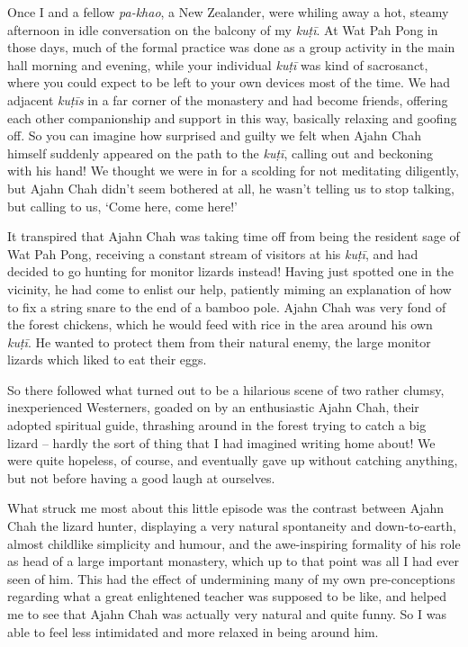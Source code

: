 Once I and a fellow \emph{pa-khao}, a New Zealander, were whiling away a
hot, steamy afternoon in idle conversation on the balcony of my
\emph{kuṭī}. At Wat Pah Pong in those days, much of the formal practice
was done as a group activity in the main hall morning and evening, while
your individual \emph{kuṭī} was kind of sacrosanct, where you could
expect to be left to your own devices most of the time. We had adjacent
\emph{kuṭīs} in a far corner of the monastery and had become friends, 
offering each other companionship and support in this way, basically
relaxing and goofing off. So you can imagine how surprised and guilty we
felt when Ajahn Chah himself suddenly appeared on the path to the
\emph{kuṭī}, calling out and beckoning with his hand! We thought we were
in for a scolding for not meditating diligently, but Ajahn Chah didn't
seem bothered at all, he wasn't telling us to stop talking, but calling
to us, `Come here, come here!'

It transpired that Ajahn Chah was taking time off from being the
resident sage of Wat Pah Pong, receiving a constant stream of visitors
at his \emph{kuṭī}, and had decided to go hunting for monitor lizards
instead! Having just spotted one in the vicinity, he had come to enlist
our help, patiently miming an explanation of how to fix a string snare
to the end of a bamboo pole. Ajahn Chah was very fond of the forest
chickens, which he would feed with rice in the area around his own
\emph{kuṭī}. He wanted to protect them from their natural enemy, the
large monitor lizards which liked to eat their eggs. 

So there followed what turned out to be a hilarious scene of two rather
clumsy, inexperienced Westerners, goaded on by an enthusiastic Ajahn
Chah, their adopted spiritual guide, thrashing around in the forest
trying to catch a big lizard -- hardly the sort of thing that I had
imagined writing home about! We were quite hopeless, of course, and
eventually gave up without catching anything, but not before having a
good laugh at ourselves. 

What struck me most about this little episode was the contrast between
Ajahn Chah the lizard hunter, displaying a very natural spontaneity and
down-to-earth, almost childlike simplicity and humour, and the
awe-inspiring formality of his role as head of a large important
monastery, which up to that point was all I had ever seen of him. This
had the effect of undermining many of my own pre-conceptions regarding
what a great enlightened teacher was supposed to be like, and helped me
to see that Ajahn Chah was actually very natural and quite funny. So I
was able to feel less intimidated and more relaxed in being around him. 


